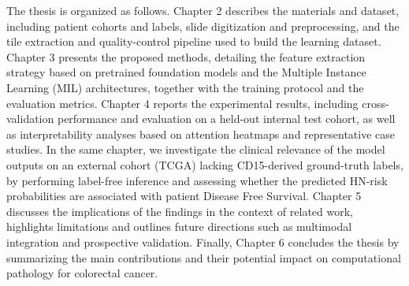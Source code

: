 The thesis is organized as follows. Chapter 2 describes the materials and dataset, including patient cohorts and labels, slide digitization and preprocessing, and the tile extraction and quality-control pipeline used to build the learning dataset. Chapter 3 presents the proposed methods, detailing the feature extraction strategy based on pretrained foundation models and the Multiple Instance Learning (MIL) architectures, together with the training protocol and the evaluation metrics. Chapter 4 reports the experimental results, including cross-validation performance and evaluation on a held-out internal test cohort, as well as interpretability analyses based on attention heatmaps and representative case studies. In the same chapter, we investigate the clinical relevance of the model outputs on an external cohort (TCGA) lacking CD15-derived ground-truth labels, by performing label-free inference and assessing whether the predicted HN-risk probabilities are associated with patient Disease Free Survival.
Chapter 5 discusses the implications of the findings in the context of related work, highlights limitations and outlines future directions such as multimodal integration and prospective validation. Finally, Chapter 6 concludes the thesis by summarizing the main contributions and their potential impact on computational pathology for colorectal cancer.

